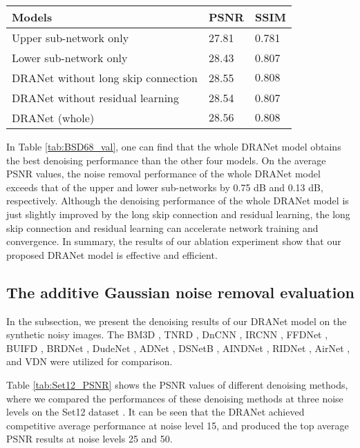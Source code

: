 \documentclass[3p,times]{elsarticle}
\begin{document}
\begin{table*}[htbp]
\centering
\caption{Quantitative results (PSNR) for the AWGN removal evaluation. The best result are bolded.}
\label{tab:BSD68_val}
\begin{tabular}{lll}
\hline
Models & PSNR & SSIM\\
\hline
Upper sub-network only& 27.81 & 0.781\\
\hline
Lower sub-network only& 28.43 & 0.807\\
\hline
DRANet without long skip connection & 28.55 & $\mathbf{0.808}$\\
\hline
DRANet without residual learning & 28.54 & 0.807\\
\hline
DRANet (whole) & $\mathbf{28.56}$ & $\mathbf{0.808}$\\
\hline
\end{tabular}
\end{table*}

In Table \ref{tab:BSD68_val}, one can find that the whole DRANet model obtains the best denoising performance than the other four models. On the average PSNR values, the noise removal performance of the whole DRANet model exceeds that of the upper and lower sub-networks by 0.75 dB and 0.13 dB, respectively. Although the denoising performance of the whole DRANet model is just slightly improved by the long skip connection and residual learning, the long skip connection and residual learning can accelerate network training and convergence. In summary, the results of our ablation experiment show that our proposed DRANet model is effective and efficient.

\subsection{The additive Gaussian noise removal evaluation}
In the subsection, we present the denoising results of our DRANet model on the synthetic noisy images. The BM3D \cite{Dabov2007}, TNRD \cite{Chen2017}, DnCNN \cite{Zhang2017}, IRCNN \cite{ZhangZGZ2017}, FFDNet \cite{Zhang2018}, BUIFD \cite{Helou2020}, BRDNet \cite{Tian2020}, DudeNet \cite{Tian2021}, ADNet \cite{TianX2020}, DSNetB \cite{Peng2019}, AINDNet \cite{Kim2020}, RIDNet \cite{Anwar2019}, AirNet \cite{Li2022}, and VDN \cite{Yue2019} were utilized for comparison.

Table \ref{tab:Set12_PSNR} shows the PSNR values of different denoising methods, where we compared the performances of these denoising methods at three noise levels on the Set12 dataset \cite{Roth2005}. It can be seen that the DRANet achieved competitive average performance at noise level 15, and produced the top average PSNR results at noise levels 25 and 50.
\end{document}
